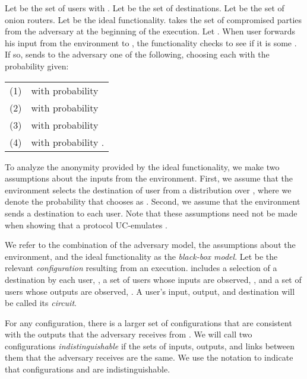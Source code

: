 \documentclass[prodmode,acmtissec]{acmsmall}
\begin{document}
Let  be the set of users with .  Let  be the set of destinations. Let  be the set of onion routers. Let  be the ideal functionality.  takes the set  of compromised parties from the adversary at the beginning of the execution. Let . When user  forwards his input from the environment to , the functionality checks to see if it is some . If so,  sends to the adversary one of the following, choosing each with the probability given:

\begin{tabular}{ll}
\centering
(1) &  with probability \\
(2) &  with probability \\
(3) &  with probability \\
(4) &  with probability .
\end{tabular}



To analyze the anonymity provided by the ideal functionality, we make two assumptions about the inputs from the environment. First, we assume that the environment selects the destination of user  from a distribution  over , where we denote the probability that  chooses  as . Second, we assume that the environment sends a destination to each user. Note that these assumptions need not be made when showing that a protocol UC-emulates . 

We refer to the combination of the adversary model, the assumptions about the environment, and the ideal functionality as the \emph{black-box model}. Let  be the relevant \emph{configuration} resulting from an execution.  includes a selection of a destination by each user, , a set of users whose inputs are observed, , and a set of users whose outputs are observed, . A user's input, output, and destination will be called its \emph{circuit}.

For any configuration, there is a larger set of configurations that are consistent with the outputs that the adversary receives from .  We will call two configurations \emph{indistinguishable} if the sets of inputs, outputs, and links between them that the adversary receives are the same.
We use the notation  to indicate that configurations  and  are indistinguishable.
\end{document}

